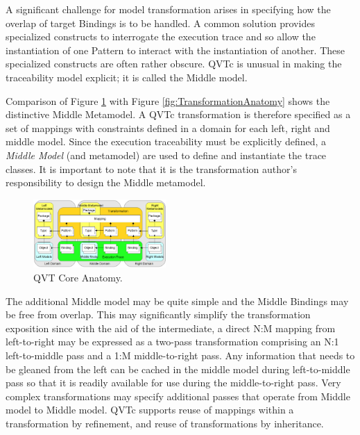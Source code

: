 A significant challenge for model transformation arises in specifying how the overlap of target Bindings is to be handled. A common solution provides specialized constructs to interrogate the execution trace and so allow the instantiation of one Pattern to interact with the instantiation of another. These specialized constructs are often rather obscure. QVTc is unusual in making the traceability model explicit; it is called the Middle model.

Comparison of Figure \ref{fig:QVTCoreAnatomy} with Figure \ref{fig:TransformationAnatomy} shows the distinctive Middle Metamodel. A QVTc transformation is therefore specified as a set of mappings with constraints defined in a domain for each left, right and middle model. Since the execution traceability must be explicitly defined, a \textit{Middle Model} (and metamodel) are used to define and instantiate the trace classes. It is important to note that it is the transformation author's responsibility to design the Middle metamodel.


\begin{figure}[h]
	\center
	\includegraphics[width=0.45\textwidth]{QVTcore.png}
	\caption{QVT Core Anatomy.}
	\label{fig:QVTCoreAnatomy}
\end{figure}

The additional Middle model may be quite simple and the Middle Bindings may be free from overlap. This may significantly simplify the transformation exposition since with the aid of the intermediate, a direct N:M mapping from left-to-right may be expressed as a two-pass transformation comprising an N:1 left-to-middle pass and a 1:M middle-to-right pass. Any information that needs to be gleaned from the left can be cached in the middle model during left-to-middle pass so that it is readily available for use during the middle-to-right pass. Very complex transformations may specify additional passes that operate from Middle model to Middle model. QVTc supports reuse of mappings within a transformation by refinement, and reuse of transformations by inheritance.

